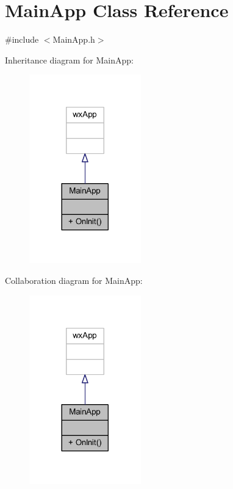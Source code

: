 \hypertarget{class_main_app}{}\section{Main\+App Class Reference}
\label{class_main_app}


{\ttfamily \#include $<$Main\+App.\+h$>$}



Inheritance diagram for Main\+App\+:
\nopagebreak
\begin{figure}[H]
\begin{center}
\leavevmode
\includegraphics[width=137pt]{class_main_app__inherit__graph}
\end{center}
\end{figure}


Collaboration diagram for Main\+App\+:
\nopagebreak
\begin{figure}[H]
\begin{center}
\leavevmode
\includegraphics[width=137pt]{class_main_app__coll__graph}
\end{center}
\end{figure}
